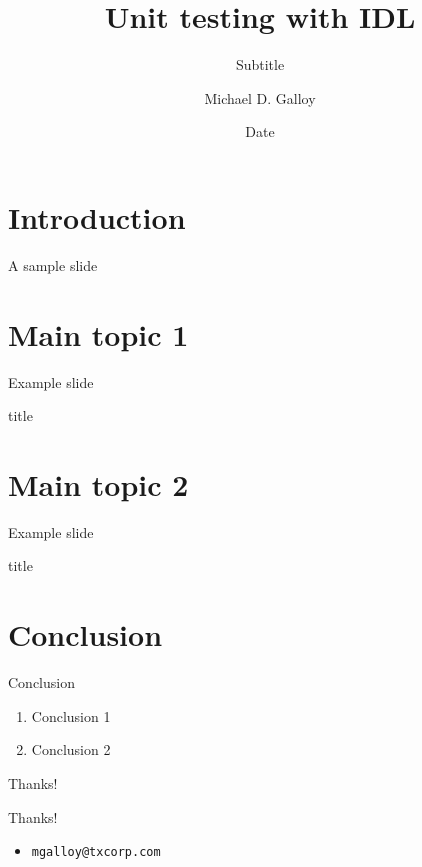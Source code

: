 \documentclass{beamer}
\title{Unit testing with IDL}
\subtitle{Subtitle}
\author{Michael D. Galloy}
\institute[Tech-X Corporation]{}
\date{Date}
\begin{document}
\begin{frame}[plain]
  \titlepage
\end{frame}


\section{Introduction}


\begin{frame}{A sample slide}
\end{frame}


\section{Main topic 1}


\begin{frame}{Example slide}
\end{frame}

\begin{frame}{title}
\end{frame}


\section{Main topic 2}


\begin{frame}{Example slide}
\end{frame}

\begin{frame}{title}
\end{frame}


\section{Conclusion}


\begin{frame}{Conclusion}
  \begin{enumerate}
    \item Conclusion 1
    \item Conclusion 2
  \end{enumerate}
\end{frame}

\begin{frame}{Thanks!}
  \begin{center}{\huge Thanks!}\end{center}
  \begin{itemize}
    \item {\tt mgalloy@txcorp.com}
  \end{itemize}
\end{frame}
\end{document}
